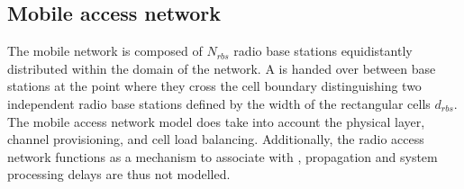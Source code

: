 \subsection{Mobile access network}
The mobile network is composed of $N_{rbs}$ radio base stations equidistantly distributed within the domain of the network. A \ue{} is handed over between base stations at the point where they cross the cell boundary distinguishing two independent radio base stations defined by the width of the rectangular cells $d_{rbs}$. The mobile access network model does take into account the physical layer, channel provisioning, and cell load balancing. Additionally, the radio access network functions as a mechanism to associate \ues{} with \dcs{}, propagation and system processing delays are thus not modelled.